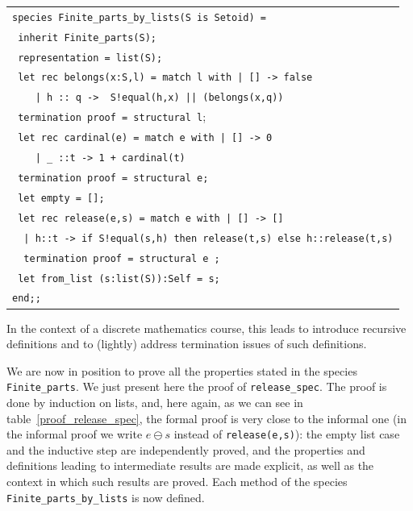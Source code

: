 \documentclass[submission,copyright,creativecommons]{eptcs}
\begin{document}
\begin{center}
\begin{scriptsize}
\begin{tabular}{|l|}
\hline
\verb+species Finite_parts_by_lists(S is Setoid) =+\\
\verb+ inherit Finite_parts(S);+\\
\verb+ representation = list(S);+\\
\verb+ let rec belongs(x:S,l) = match l with | [] -> false+\\
\verb+    | h :: q ->  S!equal(h,x) || (belongs(x,q))+\\
\verb+ termination proof = structural l+;\\
\verb+ let rec cardinal(e) = match e with | [] -> 0+\\
\verb~    | _ ::t -> 1 + cardinal(t)~\\
\verb+ termination proof = structural e;+ \\
\verb+ let empty = [];+\\
\verb+ let rec release(e,s) = match e with | [] -> []+\\
\verb+  | h::t -> if S!equal(s,h) then release(t,s) else h::release(t,s)+\\
\verb+  termination proof = structural e ;+\\
\verb+ let from_list (s:list(S)):Self = s;+ \\
\verb+end;;+\\
\hline
\end{tabular}
\end{scriptsize}
\end{center}

\noindent
In the context of a discrete mathematics course, this leads to
introduce recursive definitions and to (lightly) address termination issues of such definitions.

We are now in position to prove all the properties 
stated in the species {\footnotesize \tt Finite\_parts}. We just
present here the proof of {\footnotesize \tt release\_spec}. The proof is
done by induction on lists, and, here again,
as we can see in table~\ref{proof_release_spec}, the formal proof is
very close to the informal one
(in the informal proof we write $e \ominus s$ instead of 
{\footnotesize \tt release(e,s)}):  the empty list case and the inductive
step are independently proved, and the properties and definitions
leading to intermediate results are made explicit, as well as the
context in which such results are proved. Each method of the species  
{\footnotesize \tt Finite\_parts\_by\_lists}
is now defined.
\end{document}

